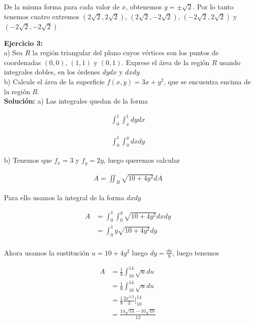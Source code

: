 \documentclass[a4paper]{article}
\begin{document}
De la misma forma para cada valor de $x$, obtenemos $y= \pm\sqrt{2}$. Por lo tanto tenemos cuatro extremos $(2\sqrt{2},2\sqrt{2})$, $(2\sqrt{2}, - 2\sqrt{2})$, $(-2\sqrt{2},2\sqrt{2})$ y $(-2\sqrt{2},-2\sqrt{2})$





\newpage

\textbf{Ejercicio 3:} \\

a) Sea $R$ la región triangular del plano cuyos vértices son los puntos de coordenadas $(0,0)$, $(1,1)$ y $(0,1)$. Exprese el área de la región $R$ usando integrales dobles, en los órdenes $dydx$ y $dxdy$ \\

b)  Calcule el área de la superficie $f(x,y)= 3x+y^2$, que se encuentra encima de la región $R$. \\

\textbf{Solución: } a) Las integrales quedan de la forma

\begin{align*}
    \int_0^1\int_x^1 dydx 
\end{align*}

\begin{align*}
    \int_0^1\int_0^y dxdy 
\end{align*}

b)  Tenemos que $f_x=3$ y $f_y=2y$, luego queremos calcular

\begin{align*}
    A = \iint_R \sqrt{10+4y^2}dA
\end{align*}

Para ello usamos la integral de la forma $dxdy$


\begin{align*}
    A &= \int_0^1\int_0^y   \sqrt{10+4y^2}dxdy \\
    &= \int_0^1  y\sqrt{10+4y^2}dy \\
\end{align*}

Ahora usamos la sustitución $u=10+4y^2$ luego $dy=\frac{du}{8}$, luego tenemos


\begin{align*}
    A &= \frac{1}{8}\int_10^14 \sqrt{u}du \\
    &= \frac{1}{8}\int_10^14 \sqrt{u}du \\
    &= \frac{1}{8} \frac{2x^{3/2}}{3} \bigg|_{10}^{14} \\
    &= \frac{14\sqrt{14}-10\sqrt{10}}{12}
\end{align*}
\end{document}
